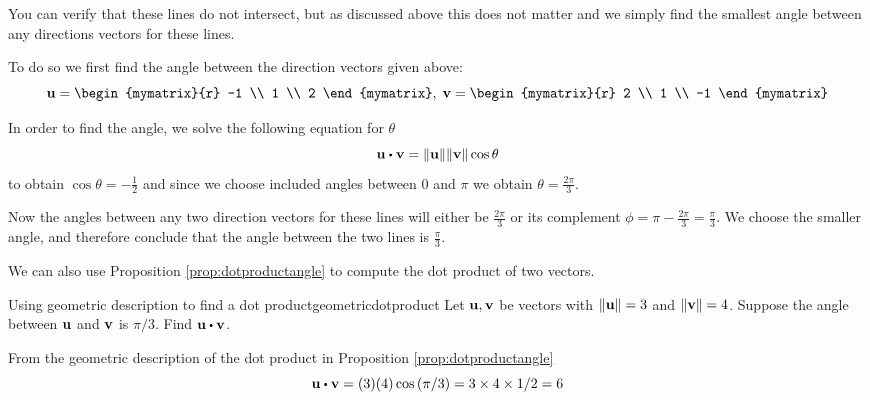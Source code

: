 \begin{solution}
You can verify that these lines do not intersect, but as discussed
above this does not matter and we simply find the smallest angle
between any directions vectors for these lines.

To do so  we first find the angle
between the direction vectors given above:
\begin{equation*}
\vect{u}=\begin{mymatrix}{r}
-1 \\
1 \\
2
\end{mymatrix},\;
\vect{v}=\begin{mymatrix}{r}
2 \\
1 \\
-1
\end{mymatrix}
\end{equation*}

In order to find the angle, we solve the following equation for $\theta$
\begin{equation*}
\vect{u}\dotprod \vect{v}=\vectlength \vect{u}\vectlength \vectlength \vect{v}
\vectlength \cos \theta
\end{equation*}
to obtain $\cos \theta = -\frac{1}{2}$ and since we choose included
angles between $0$ and $\pi$ we obtain $\theta = \frac{2 \pi}{3}$.


Now the angles between any two direction vectors for these lines will
either be $\frac{2 \pi}{3}$ or its complement $ \phi = \pi -  \frac{2 \pi}{3}
= \frac{\pi}{3}$. We choose the smaller angle, and therefore conclude that the angle between the two lines is $\frac{\pi}{3}$.
\end{solution}

We can also use Proposition \ref{prop:dotproductangle} to compute the dot product of two vectors.

\begin{example}{Using geometric description to find a dot product}{geometricdotproduct}
Let ${\bf u},{\bf v}$ be vectors with $ \| {\bf u} \| = 3$ and $\| {\bf v} \| = 4$. 
Suppose the angle between ${\bf u}$ and ${\bf v}$ is $\pi / 3$. Find $\vect{u}\dotprod \vect{v}$.
\end{example}

\begin{solution}
From the geometric description of the dot product in Proposition \ref{prop:dotproductangle}
\begin{equation*}
\vect{u}\dotprod \vect{v}=(3)(4) \cos \left( \pi / 3\right) =3\times
4\times 1/2=6
\end{equation*}
\end{solution}


